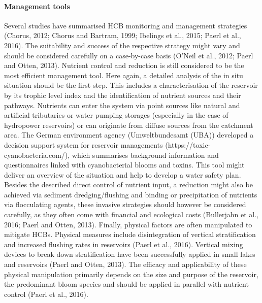 \paragraph {Management tools}
Several studies have summarised HCB monitoring and management strategies (Chorus, 2012; Chorus and Bartram, 1999; Ibelings et al., 2015; Paerl et al., 2016). The suitability and success of the respective strategy might vary and should be considered carefully on a case-by-case basis (O’Neil et al., 2012; Paerl and Otten, 2013). Nutrient control and reduction is still considered to be the most efficient management tool. Here again, a detailed analysis of the in situ situation should be the first step. This includes a characterisation of the reservoir by its trophic level index and the identification of nutrient sources and their pathways. Nutrients can enter the system via point sources like natural and artificial tributaries or water pumping storages (especially in the case of hydropower reservoirs) or can originate from diffuse sources from the catchment area. The German environment agency (Umweltbundesamt (UBA)) developed a decision support system for reservoir managements (https://toxic-cyanobacteria.com/), which summarises background information and questionnaires linked with cyanobacterial blooms and toxins. This tool might deliver an overview of the situation and help to develop a water safety plan.
Besides the described direct control of nutrient input, a reduction might also be achieved via sediment dredging/flushing and binding or precipitation of nutrients via flocculating agents,  these invasive strategies should however be considered carefully, as they often come with financial and ecological costs (Bullerjahn et al., 2016; Paerl and Otten, 2013). Finally, physical factors are often manipulated to mitigate HCBs. Physical measures include disintegration of vertical stratification and increased flushing rates in reservoirs (Paerl et al., 2016). Vertical mixing devices to break down stratification have been successfully applied in small lakes and reservoirs (Paerl and Otten, 2013). The efficacy and applicability of these physical manipulation primarily depends on the size and purpose of the reservoir, the predominant bloom species and should be applied in parallel with nutrient control (Paerl et al., 2016).
